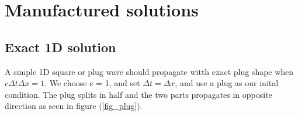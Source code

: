 \section{Manufactured solutions}
\subsection{Exact 1D solution}
A simple 1D square or plug wave should propagate witth exact plug shape when $c\Delta t\Delta x = 1$. We choose c = 1, and set $\Delta t = \Delta x$, and 
use a plug as our inital condition. The plug splits in half and the two parts propagates in opposite direction as seen in figure (\ref{fig_plug}).

\begin{figure}[H]

\end{figure}
